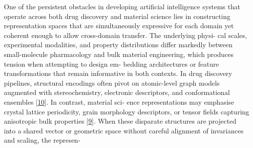 \documentclass[
]{article}
\begin{document}
One of the persistent obstacles in developing artificial intelligence
systems that operate across both drug discovery and material science
lies in constructing representation spaces that are simultaneously
expressive for each domain yet coherent enough to allow cross-domain
transfer. The underlying physi- cal scales, experimental modalities, and
property distributions differ markedly between small-molecule
pharmacology and bulk material engineering, which produces tension when
attempting to design em- bedding architectures or feature
transformations that remain informative in both contexts. In drug
discovery pipelines, structural encodings often pivot on atomic-level
graph models augmented with stereochemistry, electronic descriptors, and
conformational ensembles {[}\hyperref[_bookmark50]{10}{]}. In contrast,
material sci- ence representations may emphasise crystal lattice
periodicity, grain morphology descriptors, or tensor fields capturing
anisotropic bulk properties {[}\hyperref[_bookmark49]{9}{]}. When these
disparate structures are projected into a shared vector or geometric
space without careful alignment of invariances and scaling, the
represen-
\end{document}
